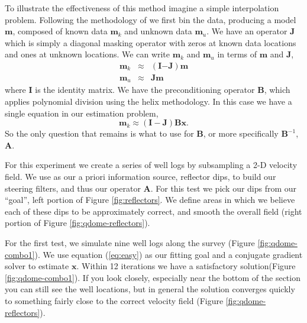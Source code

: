 To illustrate the effectiveness of this method
imagine a simple interpolation problem.
Following the methodology of \cite{Fomel.sep.95.sergey1} we first bin the 
data, producing
a model $\mathbf m$, composed of known data $\mathbf m_k$ and unknown data 
$\mathbf m_u$.  We 
have an operator $\mathbf J$ which is simply a diagonal masking operator with 
zeros at known data locations and ones at unknown locations. We can write
$\mathbf m_k$ and $\mathbf m_u$ in terms of $\mathbf m$ and $\mathbf J$,
\begin{eqnarray}
\mathbf m_k &\approx& (\mathbf I\mathbf - \mathbf J)\mathbf m \\
\mathbf m_u &\approx& \mathbf J \mathbf m
\end{eqnarray}
where $\mathbf I$ is the identity matrix.  
We have the preconditioning operator $\mathbf B$, which applies polynomial
division using the helix methodology.  In this case we have a 
single equation in our estimation problem,
\begin{equation}
\mathbf m_k \approx (\mathbf I-\mathbf J) \mathbf B \mathbf x .
\label{eq:easy}
\end{equation}
So the only question that remains is what to use for $\mathbf B$, or 
more specifically $\mathbf B^{-1}$, $\mathbf A$.
\par
For this experiment  
we create a series of well logs by subsampling a 2-D velocity field.
We use as our a priori information source, reflector dips,
to build  our steering filters, and thus our operator $\mathbf A$. 
For this test we  pick our dips  from our ``goal'',
left portion of Figure \ref{fig:reflectors}.
We define areas in which we believe each of these dips to be
approximately correct, and  smooth the overall 
field (right portion of Figure \ref{fig:qdome-reflectors}).


\par
For the first test, we simulate nine well logs along the survey
(Figure \ref{fig:qdome-combo1}). We use equation (\ref{eq:easy}) as our
fitting goal and  a conjugate gradient solver to estimate $\mathbf x$.
Within 12 iterations we  have a satisfactory 
solution(Figure \ref{fig:qdome-combo1}).
If you look closely, especially near the bottom of the section you
can still see the well locations, but in general the solution 
converges quickly to something 
fairly close to the correct velocity field (Figure \ref{fig:qdome-reflectors}). 


